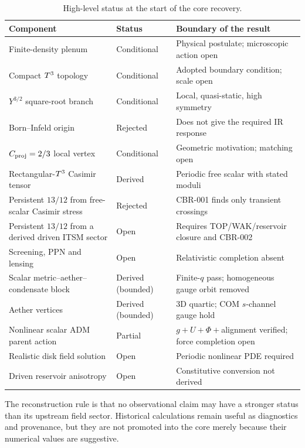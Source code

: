 \begin{table}[ht]
\centering
\small
\caption{High-level status at the start of the core recovery.}
\begin{tabular}{@{}p{}@{\hspace{0.8em}}p{}@{\hspace{0.8em}}p{}@{}}
\toprule
Component & Status & Boundary of the result \\
\midrule
Finite-density plenum & Conditional & Physical postulate; microscopic action open \\
Compact $T^3$ topology & Conditional & Adopted boundary condition; scale open \\
$Y^{3/2}$ square-root branch & Conditional & Local, quasi-static, high symmetry \\
Born--Infeld origin & Rejected & Does not give the required IR response \\
$C_{\mathrm{proj}}=2/3$ local vertex & Conditional & Geometric motivation; matching open \\
Rectangular-$T^3$ Casimir tensor & Derived & Periodic free scalar with stated moduli \\
Persistent $13/12$ from free-scalar Casimir stress & Rejected & CBR-001 finds only transient crossings \\
Persistent $13/12$ from a derived driven ITSM sector & Open & Requires TOP/WAK/reservoir closure and CBR-002 \\
Screening, PPN and lensing & Open & Relativistic completion absent \\
Scalar metric--aether--condensate block & Derived (bounded) & Finite-$q$ pass; homogeneous gauge orbit removed \\
Aether vertices & Derived (bounded) & 3D quartic; COM $s$-channel gauge hold \\
Nonlinear scalar ADM parent action & Partial & $g+U+\Phi+$alignment verified; force completion open \\
Realistic disk field solution & Open & Periodic nonlinear PDE required \\
Driven reservoir anisotropy & Open & Constitutive conversion not derived \\
\bottomrule
\end{tabular}
\end{table}

The reconstruction rule is that no observational claim may have a stronger
status than its upstream field sector.  Historical calculations remain useful
as diagnostics and provenance, but they are not promoted into the core merely
because their numerical values are suggestive.
